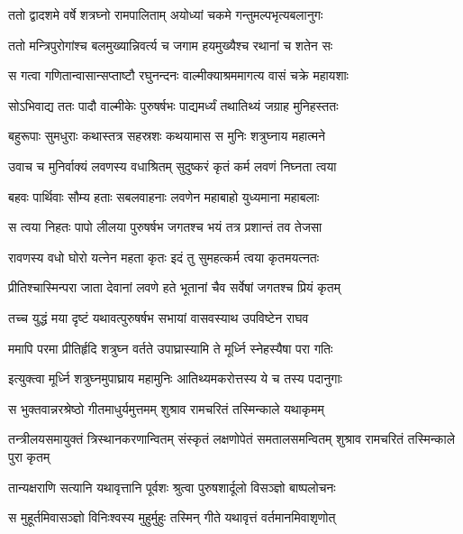 
\twolineshloka
{ततो द्वादशमे वर्षे शत्रघ्नो रामपालिताम्}
{अयोध्यां चकमे गन्तुमल्पभृत्यबलानुगः} %

\twolineshloka
{ततो मन्त्रिपुरोगांश्च बलमुख्यान्निवर्त्य च}
{जगाम हयमुख्यैश्च रथानां च शतेन सः} %

\twolineshloka
{स गत्वा गणितान्वासान्सप्ताष्टौ रघुनन्दनः}
{वाल्मीक्याश्रममागत्य वासं चक्रे महायशाः} %

\twolineshloka
{सोऽभिवाद्य ततः पादौ वाल्मीकेः पुरुषर्षभः}
{पाद्यमर्ध्यं तथातिथ्यं जग्राह मुनिहस्ततः} %

\twolineshloka
{बहुरूपाः सुमधुराः कथास्तत्र सहस्रशः}
{कथयामास स मुनिः शत्रुघ्नाय महात्मने} %

\twolineshloka
{उवाच च मुनिर्वाक्यं लवणस्य वधाश्रितम्}
{सुदुष्करं कृतं कर्म लवणं निघ्नता त्वया} %

\twolineshloka
{बहवः पार्थिवाः सौम्य हताः सबलवाहनाः}
{लवणेन महाबाहो युध्यमाना महाबलाः} %

\twolineshloka
{स त्वया निहतः पापो लीलया पुरुषर्षभ}
{जगतश्च भयं तत्र प्रशान्तं तव तेजसा} %

\twolineshloka
{रावणस्य वधो घोरो यत्नेन महता कृतः}
{इदं तु सुमहत्कर्म त्वया कृतमयत्नतः} %

\twolineshloka
{प्रीतिश्चास्मिन्परा जाता देवानां लवणे हते}
{भूतानां चैव सर्वेषां जगतश्च प्रियं कृतम्} %

\twolineshloka
{तच्च युद्धं मया दृष्टं यथावत्पुरुषर्षभ}
{सभायां वासवस्याथ उपविष्टेन राघव} %

\twolineshloka
{ममापि परमा प्रीतिर्हृदि शत्रुघ्न वर्तते}
{उपाघ्रास्यामि ते मूर्ध्नि स्नेहस्यैषा परा गतिः} %

\twolineshloka
{इत्युक्त्वा मूर्ध्नि शत्रुघ्नमुपाघ्राय महामुनिः}
{आतिथ्यमकरोत्तस्य ये च तस्य पदानुगाः} %

\twolineshloka
{स भुक्तवान्नरश्रेष्ठो गीतमाधुर्यमुत्तमम्}
{शुश्राव रामचरितं तस्मिन्काले यथाकृमम्} %

\threelineshloka
{तन्त्रीलयसमायुक्तं त्रिस्थानकरणान्वितम्}
{संस्कृतं लक्षणोपेतं समतालसमन्वितम्}
{शुश्राव रामचरितं तस्मिन्काले पुरा कृतम्} %

\twolineshloka
{तान्यक्षराणि सत्यानि यथावृत्तानि पूर्वशः}
{श्रुत्वा पुरुषशार्दूलो विसञ्ज्ञो बाष्पलोचनः} %

\twolineshloka
{स मुहूर्तमिवासञ्ज्ञो विनिःश्वस्य मुहुर्मुहुः}
{तस्मिन् गीते यथावृत्तं वर्तमानमिवाशृणोत्} %

